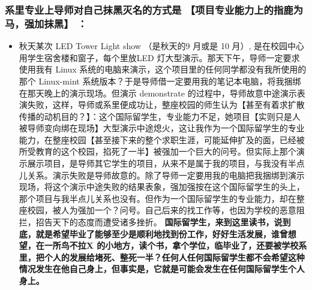 \documentclass[9pt, b5paper]{article}
\begin{document}
\subsubsection{系里专业上导师对自己抹黑灭名的方式是 \textbf{【项目专业能力上的指鹿为马，强加抹黑】} ：}
\label{sec-3-1-1}
\begin{itemize}
\item 秋天某次 LED Tower Light show （是秋天的9 月或是 10 月）, 是在校园中心用学生宿舍楼和窗子，每个里放LED 灯大型演示。那天下午，导师一定要求使用我有 Linux 系统的电脑来演示，这个项目里的任何同学都没有我所使用的那个 Linux-mint 系统版本？于是导师借一定要用我的笔记本电脑，将我捆绑在那天晚上的演示现场。但演示 demonstrate 的过程中，导师故意中途演示表演失败，这样，导师或系里便成功让，整座校园的师生认为【甚至有着求扩散传播的动机目的？】：这个国际留学生，专业能力不足，她项目【实则只是人被导师变向绑在现场】大型演示中途熄火，这让我作为一个国际留学生的专业能力，在整座校园【甚至接下来的整个求职生涯，可能延伸扩及的面，已经被所受教育的这个校园，掐死了一半】被强加一个巨大的问号。但实际上那个演示展示项目，是导师其它学生的项目，从来不是属于我的项目，与我没有半点儿关系。演示失败是导师故意的。除了导师一定要用我的电脑把我捆绑到演示现场，将这个演示中途失败的结果表象，强加强按在这个国际留学生的头上，那个项目与我半点儿关系也没有。但作为一个国际留学生的专业能力，却在整座校园，被人为强加一个？问号。自己后来的找工作等，也因为学校的恶意阻拦，招告天下的态度而遭受诸多挫折。 \textbf{国际留学生，来到这里读书，说到底，就是希望毕业了能够至少是顺利地找到份工作，好好生活发展，谁曾想望，在一所鸟不拉X 的小地方，读个书，拿个学位，临毕业了，还要被学校系里，把个人的发展给堵死、整死一半？任何人任何国际留学生都不会希望这种情况发生在他自己身上，但事实是，它就是可能会发生在任何国际留学生个人身上。}
\end{itemize}
\end{document}
